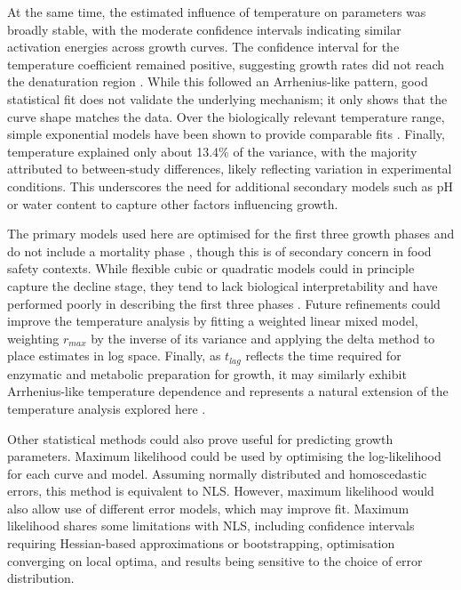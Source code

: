 \documentclass[11pt]{article}
\begin{document}
At the same time, the estimated influence of temperature on parameters was broadly stable, with the 
moderate confidence intervals indicating similar activation energies across growth curves. The 
confidence interval for the temperature coefficient remained positive, suggesting growth 
rates did not reach the denaturation region \citep{peleg2012arrhenius}. While this followed 
an Arrhenius-like pattern, good statistical fit does not validate the underlying mechanism; 
it only shows that the curve shape matches the data. Over the biologically relevant 
temperature range, simple exponential models have been shown to provide comparable fits 
\citep{peleg2012arrhenius}. Finally, temperature explained only about 13.4\% of the variance, 
with the majority attributed to between‑study differences, likely reflecting variation in 
experimental conditions. This underscores the need for additional secondary models such as pH or water content \citep{peleg2011microbial} to capture other factors influencing growth.

The primary models used here are optimised for the first three growth phases and do not 
include a mortality phase \citep{peleg2011microbial}, though this is of secondary concern in 
food safety contexts. While flexible cubic or quadratic models could in principle capture 
the decline stage, they tend to lack biological interpretability and have performed poorly 
in describing the first three phases \citep{zwietering1990modeling}. Future refinements 
could improve the temperature analysis by fitting a weighted linear mixed model, weighting 
$r_{max}$ by the inverse of its variance and applying the delta method to place estimates in 
log space. Finally, as $t_{lag}$ reflects the time required for enzymatic and metabolic 
preparation for growth, it may similarly exhibit Arrhenius-like temperature dependence and 
represents a natural extension of the temperature analysis explored here \citep{peleg2012arrhenius}.

Other statistical methods could also prove useful for predicting growth parameters. Maximum 
likelihood could be used by optimising the log-likelihood for each curve and model. Assuming 
normally distributed and homoscedastic errors, this method is equivalent to NLS. However, 
maximum likelihood would also allow use of different error models, which may improve fit. Maximum likelihood shares some 
limitations with NLS, including confidence intervals requiring Hessian-based approximations or 
bootstrapping, optimisation converging on local optima, and results being sensitive to the 
choice of error distribution.
\end{document}
